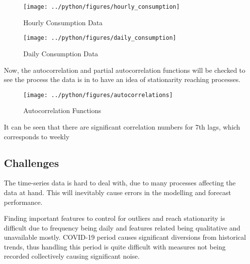 \documentclass[11pt, a4paper, leqno]{article}
\begin{document}
\begin{figure}[H]

    \centering
    \texttt{[image: ../python/figures/hourly\_consumption]}

    \caption{Hourly Consumption Data}
    \label{fig:hourly_consumption}

\end{figure}


\begin{figure}[H]

    \centering
    \texttt{[image: ../python/figures/daily\_consumption]}

    \caption{Daily Consumption Data}
    \label{fig:daily_consumption}

\end{figure}


Now, the autocorrelation and partial autocorrelation functions will be checked to see the process the data is in to have an idea of stationarity reaching processes.

\begin{figure}[H]

    \centering
    \texttt{[image: ../python/figures/autocorrelations]}

    \caption{Autocorrelation Functions}
    \label{fig:hourly_consumption}

\end{figure}

It can be seen that there are significant correlation numbers for 7th lags, which corresponds to weekly



\subsection{Challenges}
\label{subsec:chall}

The time-series data is hard to deal with, due to many processes affecting the data at hand. This will inevitably cause errors in the modelling and forecast performance.

Finding important features to control for outliers and reach stationarity is difficult due to frequency being daily and features related being qualitative and unavailable mostly.
COVID-19 period causes significant diversions from historical trends, thus handling this period is quite difficult with measures not being recorded collectively causing significant noise.
\end{document}
